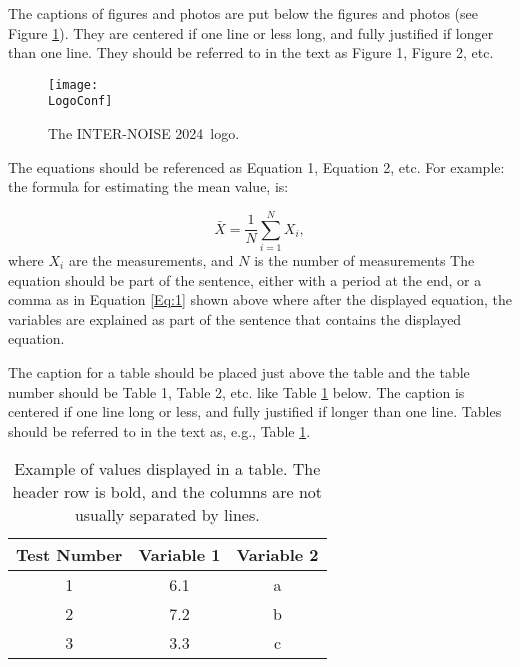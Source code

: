 \documentclass[a4paper,12pt]{article}
\newcommand{\YearConf}{2024}
\newcommand{\LogoConf}{logo_IN24.jpg}
\begin{document}
The captions of figures and photos are put below the figures and photos (see Figure \ref{fig:1}).  They are centered if one line or less long, and fully justified if longer than one line.  They should be referred to in the text as Figure 1, Figure 2, etc. 
\begin{figure}[h!]
\begin{center}
  \texttt{[image: \\LogoConf]}
  \end{center}
  \caption{The INTER-NOISE \YearConf   ~logo.}
  \label{fig:1}
\end{figure}

The equations should be referenced as Equation 1, Equation 2, etc. For example: the formula for estimating the mean value, is:

\begin{equation}
\bar{X} = \frac{1}{N} \sum_{i=1}^{N} X_i ,
\label{Eq:1}
\end{equation}
\noindent
where $X_i$ are the measurements, and $N$ is the number of measurements  The equation should be part of the sentence, either with a period at the end, or a comma as in Equation \ref{Eq:1} shown above where after the displayed equation, the variables are explained as part of the sentence that contains the displayed equation. 

The caption for a table should be placed just above the table and the table number should be Table 1, Table 2,  etc. like Table \ref{Tab:1} below.  The caption is centered if one line long or less, and fully justified if longer than one line.  Tables should be referred to in the text as, e.g., Table \ref{Tab:1}.

\begin{table}[h!]

\caption{Example of values displayed in a table. The header row is bold, and the columns are not usually separated by lines.}
\label{Tab:1}

\begin{center}
\begin{tabular}{c c c } 
 \hline
 \textbf{Test Number} &  \textbf{Variable 1}& \textbf{Variable 2}  \\ [0.5ex] 
 \hline
 1 & 6.1 & a \\ 
 \hline
 2 & 7.2 & b  \\
 \hline
 3 & 3.3 & c \\ [1ex] 
 \hline
\end{tabular}
\end{center}

\end{table}
\end{document}
